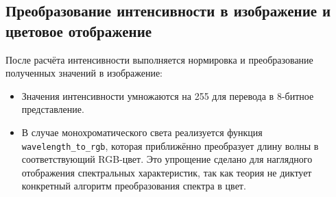 \documentclass[a4paper,11pt]{article}
\theoremstyle{definition}
\begin{document}
    \subsection{Преобразование интенсивности в изображение и цветовое отображение}
    После расчёта интенсивности выполняется нормировка и преобразование полученных значений в изображение:
    \begin{itemize}
        \item Значения интенсивности умножаются на 255 для перевода в 8-битное представление.
        \item В случае монохроматического света реализуется функция \texttt{wavelength\_to\_rgb},
        которая приближённо преобразует длину волны в соответствующий RGB-цвет. Это упрощение сделано
        для наглядного отображения спектральных характеристик, так как теория не диктует конкретный
        алгоритм преобразования спектра в цвет.


    \end{itemize}

%
\end{document}
